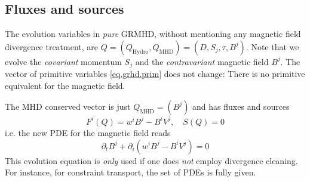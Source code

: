 \documentclass[a4paper]{article}
\newcommand{\hydro}{\text{Hydro}}
\newcommand{\mhd}{\text{MHD}}
\begin{document}
\subsection{Fluxes and sources}
The evolution variables in \emph{pure} GRMHD, without mentioning any
magnetic field divergence treatment, are 
$Q = (Q_\hydro, Q_\mhd) = (D, S_j, \tau, B^j)$.
Note that we evolve the \emph{covariant} momentum $S_j$ and the
\emph{contravariant} magnetic field $B^j$. The vector of primitive
variables \eqref{eq.grhd.prim} does not change: There is no primitive
equivalent for the magnetic field.

The MHD conserved vector is just $Q_\mhd=(B^j)$ and has fluxes and sources
\begin{equation}
F^i(Q) = w^i B^j - B^i V^j,
\quad S(Q) = 0
\end{equation}
i.e. the new PDE for the magnetic field reads
\begin{equation}\label{eq.grmhd.pdeb.simple}
\partial_t B^j + \partial_i (w^i B^j - B^i V^j) = 0
\end{equation}
This evolution equation is \emph{only} used if one does \emph{not} employ
divergence cleaning. For instance, for constraint transport, the set
of PDEs is fully given.

%
%
\end{document}
